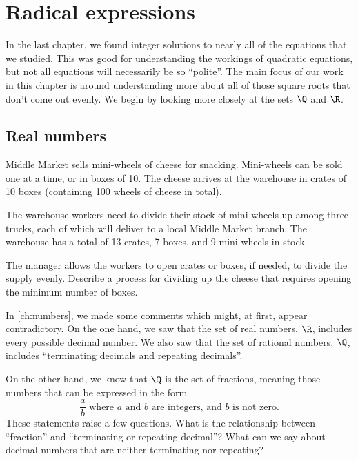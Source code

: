 \chapter{Radical expressions}
\label{ch:radicals}

\newcommand*\rfrac[2]{{}^{#1}\!/_{#2}}


In the last chapter, we found integer solutions to nearly all of the equations that we studied. This was good for understanding the workings of quadratic equations, but not all equations will necessarily be so ``polite''. The main focus of our work in this chapter is around understanding more about all of those square roots that don't come out evenly. We begin by looking more closely at the sets $\Q$ and $\R$.

\section{Real numbers}
\label{sec:radrealnumbers}

\begin{boxexplore}
Middle Market sells mini-wheels of cheese for snacking. Mini-wheels can be sold one at a time, or in boxes of 10. The cheese arrives at the warehouse in crates of 10 boxes (containing 100 wheels of cheese in total).

The warehouse workers need to divide their stock of mini-wheels up among three trucks, each of which will deliver to a local Middle Market branch. The warehouse has a total of 13 crates, 7 boxes, and 9 mini-wheels in stock.

The manager allows the workers to open crates or boxes, if needed, to divide the supply evenly. Describe a process for dividing up the cheese that requires opening the minimum number of boxes.
\end{boxexplore}

In \cref{ch:numbers}, we made some comments which might, at first, appear contradictory. On the one hand, we saw that the set of real numbers, $\R$, includes every possible decimal number. We also saw that the set of rational numbers, $\Q$, includes ``terminating decimals and repeating decimals''. 

On the other hand, we know that $\Q$ is the set of fractions, meaning those numbers that can be expressed in the form \[\frac{a}{b} \text{ where $a$ and $b$ are integers, and $b$ is not zero.}\]
These statements raise a few questions. What is the relationship between ``fraction'' and ``terminating or repeating decimal''? What can we say about decimal numbers that are neither terminating nor repeating?


